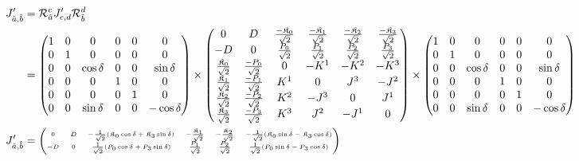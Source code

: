\documentclass[]{article}
\numberwithin{equation}{section}
\begin{document}
{{\begin{align}
    J_{\hat{a},\hat{b}}'&=\mathcal{R}_{\hat{a}}^{{c}}J_{c,d}'\mathcal{R}_{\hat{b}}^{{d}}\\
    &=\begin{pmatrix}
    1&0&0&0&0&0\\
    0&1&0&0&0&0\\
    0&0&\cos{\delta}&0&0&\sin{\delta}\\
    0&0&0&1&0&0\\
    0&0&0&0&1&0\\
    0&0&\sin{\delta}&0&0&-\cos{\delta}
    \end{pmatrix}\times\begin{pmatrix}
  0&D&\frac{-\mathfrak{K}_0}{\sqrt{2}}&\frac{-\mathfrak{K}_1}{\sqrt{2}}&\frac{-\mathfrak{K}_2}{\sqrt{2}}&\frac{-\mathfrak{K}_3}{\sqrt{2}}\\
  -D&0&\frac{P_0}{\sqrt{2}}&\frac{P_1}{\sqrt{2}}&\frac{P_2}{\sqrt{2}}&\frac{P_3}{\sqrt{2}}\\
    \frac{\mathfrak{K}_0}{\sqrt{2}}&\frac{-P_0}{\sqrt{2}}&0 & -K^{1} & -K^{2} & -K^{3}\\
    \frac{\mathfrak{K}_1}{\sqrt{2}}&\frac{-P_1}{\sqrt{2}}&K^{1} & 0 & J^{3} & -J^{2}\\
    \frac{\mathfrak{K}_2}{\sqrt{2}}&\frac{-P_2}{\sqrt{2}}&K^{2} & -J^{3} & 0 & J^{1}\\
    \frac{\mathfrak{K}_3}{\sqrt{2}}&\frac{-P_3}{\sqrt{2}}&K^{3} & J^{2} & -J^{1} & 0
  \end{pmatrix}\times\begin{pmatrix}
    1&0&0&0&0&0\\
    0&1&0&0&0&0\\
    0&0&\cos{\delta}&0&0&\sin{\delta}\\
    0&0&0&1&0&0\\
    0&0&0&0&1&0\\
    0&0&\sin{\delta}&0&0&-\cos{\delta}
    \end{pmatrix}\nonumber\\
    J_{\hat{a},\hat{b}}'&=\tiny{\begin{pmatrix}
    0&D&-\frac{1}{\sqrt{2}}(\mathfrak{K}_0\cos{\delta}+\mathfrak{K}_3\sin{\delta})&-\frac{\mathfrak{K}_1}{\sqrt{2}} &-\frac{\mathfrak{K}_2}{\sqrt{2}} &-\frac{1}{\sqrt{2}}(\mathfrak{K}_0\sin{\delta}-\mathfrak{K}_3\cos{\delta})\\
    -D&0&\frac{1}{\sqrt{2}}(P_0\cos{\delta}+P_3\sin{\delta})&\frac{P_1}{\sqrt{2}} &\frac{P_2}{\sqrt{2}} &\frac{1}{\sqrt{2}}(P_0\sin{\delta}-P_3\cos{\delta})\\

\end{pmatrix}}
\end{align}}}
\end{document}
